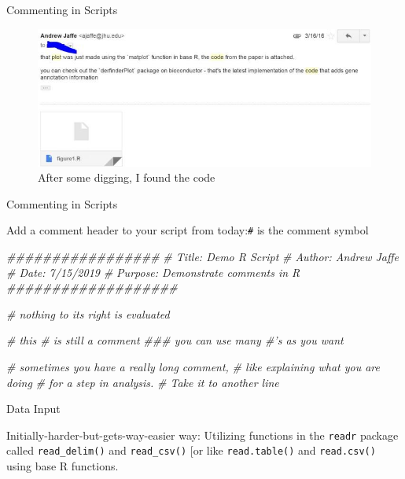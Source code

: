 \documentclass[
  ignorenonframetext,
]{beamer}
\newenvironment{Shaded}{\begin{snugshade}}{\end{snugshade}}
\newcommand{\CommentTok}[1]{\textcolor[rgb]{0.56,0.35,0.01}{\textit{#1}}}
\begin{document}
\begin{frame}{Commenting in Scripts}
\protect\hypertarget{commenting-in-scripts-3}{}

\begin{figure}
\centering
\includegraphics{media/code_fu.jpg}
\caption{After some digging, I found the code}
\end{figure}

\end{frame}

\begin{frame}[fragile]{Commenting in Scripts}
\protect\hypertarget{commenting-in-scripts-4}{}

Add a comment header to your script from today:\texttt{\#} is the
comment symbol

\begin{Shaded}
\begin{Highlighting}[]
\CommentTok{#################}
\CommentTok{# Title: Demo R Script}
\CommentTok{# Author: Andrew Jaffe}
\CommentTok{# Date: 7/15/2019}
\CommentTok{# Purpose: Demonstrate comments in R}
\CommentTok{###################}
 
\CommentTok{# nothing to its right is evaluated}

\CommentTok{# this # is still a comment}
\CommentTok{### you can use many #'s as you want}

\CommentTok{# sometimes you have a really long comment,}
\CommentTok{#    like explaining what you are doing }
\CommentTok{#    for a step in analysis. }
\CommentTok{# Take it to another line}
\end{Highlighting}
\end{Shaded}

\end{frame}

\begin{frame}[fragile]{Data Input}
\protect\hypertarget{data-input-4}{}

Initially-harder-but-gets-way-easier way: Utilizing functions in the
\texttt{readr} package called \texttt{read\_delim()} and
\texttt{read\_csv()} {[}or like \texttt{read.table()} and
\texttt{read.csv()} using base R functions.

\end{frame}
\end{document}
